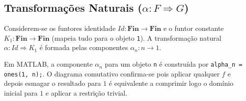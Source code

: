 \documentclass[11pt,a4paper]{article}
\begin{document}
\subsection{Transformações Naturais ($\alpha: F \Rightarrow G$)}
Considerem-se os funtores identidade $Id: \mathbf{Fin} \to \mathbf{Fin}$ e o funtor constante $K_1: \mathbf{Fin} \to \mathbf{Fin}$ (mapeia tudo para o objeto \texttt{1}). A transformação natural $\alpha: Id \Rightarrow K_1$ é formada pelas componentes $\alpha_n: n \to 1$.

Em MATLAB, a componente $\alpha_n$ para um objeto \texttt{n} é construída por \texttt{alpha\_n = ones(1, n);}. O diagrama comutativo confirma-se pois aplicar qualquer $f$ e depois esmagar o resultado para $1$ é equivalente a comprimir logo o domínio inicial para $1$ e aplicar a restrição trivial.
\end{document}
